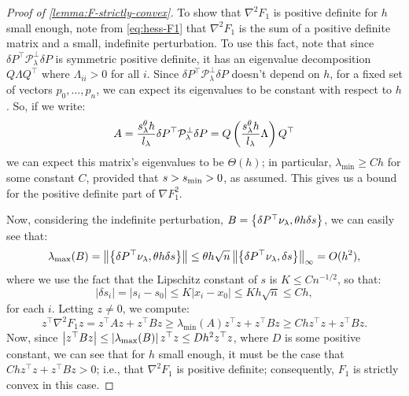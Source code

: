 \documentclass[eikonal.tex]{subfiles}
\begin{document}
\begin{proof}[Proof of \cref{lemma:F-strictly-convex}]
  To show that $\nabla^2 F_1$ is positive definite for $h$ small
  enough, note from \cref{eq:hess-F1} that $\nabla^2 F_1$ is the sum
  of a positive definite matrix and a small, indefinite
  perturbation. To use this fact, note that since
  $\delta P^\top \mathcal{P}^\perp_\lambda \delta P$ is symmetric
  positive definite, it has an eigenvalue decomposition
  $Q \Lambda Q^\top$ where $\Lambda_{ii} > 0$ for all $i$. Since
  $\delta P^\top \mathcal{P}^\perp_\lambda \delta P$ doesn't depend on
  $h$, for a fixed set of vectors $p_0, \hdots, p_n$, we can expect
  its eigenvalues to be constant with respect to $h$. So, if we write:
  \begin{equation}
    A = \frac{s^\theta_\lambda h}{l_\lambda} \delta P^\top \mathcal{P}^\perp_\lambda \delta P = Q \left(\frac{s^\theta_\lambda h}{l_\lambda} \Lambda\right) Q^\top
  \end{equation}
  we can expect this matrix's eigenvalues to be $\Theta(h)$; in
  particular, $\lambda_{\min} \geq C h$ for some constant $C$,
  provided that $s > s_{\operatorname{min}} > 0$, as assumed. This gives us a bound for
  the positive definite part of $\nabla F_1^2$.

  Now, considering the indefinite perturbation,
  $B = \left\{\delta P^\top \nu_\lambda, \theta h \delta s\right\}$, we can
  easily see that:
  \begin{equation}
    \lambda_{\max}(B) = \left\|\left\{\delta P^\top \nu_\lambda,
        \theta h \delta s\right\}\right\| \leq \theta h \sqrt{n} \left\|\left\{\delta P^\top \nu_\lambda, \delta s\right\}\right\|_\infty = O(h^2),
  \end{equation}
  where we use the fact that the Lipschitz constant of $s$ is
  $K \leq C n^{-1/2}$, so that:
  \begin{equation}
    |\delta s_i| = |s_i - s_0| \leq K |x_i - x_0| \leq K h \sqrt{n}
    \leq Ch,
  \end{equation}
  for each $i$. Letting $z \neq 0$, we compute:
  \begin{equation}
    z^\top \nabla^2 F_1 z = z^\top A z + z^\top B z \geq \lambda_{\min}(A) z^\top z + z^\top B z \geq Ch z^\top z + z^\top B z.
  \end{equation}
  Now, since
  $\left|z^\top B z\right| \leq \left|\lambda_{\max}(B)\right| z^\top z \leq D h^2
  z^\top z$, where $D$ is some positive constant, we can see that for
  $h$ small enough, it must be the case that
  $Ch z^\top z + z^\top B z > 0$; i.e., that $\nabla^2 F_1$ is
  positive definite; consequently, $F_1$ is strictly convex in this case.
\end{proof}
\end{document}
